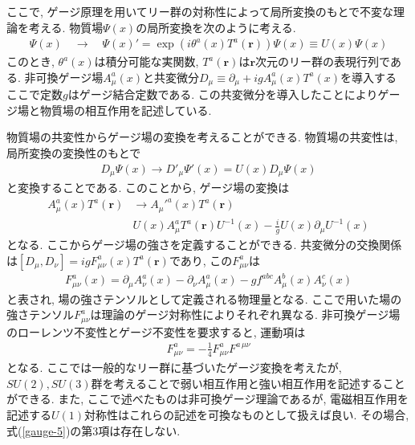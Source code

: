 ここで, ゲージ原理を用いてリー群の対称性によって局所変換のもとで不変な理論を考える.
物質場$\Psi(x)$の局所変換を次のように考える.
\begin{align}
  \Psi(x)\quad\rightarrow\quad\Psi(x)' = \exp\left(i\theta^a(x)T^a(\bm{r})\right)\Psi(x) \equiv U(x)\Psi(x) \label{gauge-2}
\end{align}
このとき, $\theta^a(x)$は積分可能な実関数, $T^a(\bm{r})$は$\bm{r}$次元のリー群の表現行列である.
非可換ゲージ場$A^a_\mu(x)$と共変微分$D_\mu\equiv\partial_\mu+ig A^a_\mu(x)T^a(x)$を導入する
ここで定数$g$はゲージ結合定数である.
この共変微分を導入したことによりゲージ場と物質場の相互作用を記述している.

物質場の共変性からゲージ場の変換を考えることができる.
物質場の共変性は, 局所変換の変換性のもとで
\begin{align}
  D_\mu\Psi(x) \rightarrow D'_\mu \Psi'(x) = U(x) D_\mu \Psi(x)\label{gauge-3}
\end{align}
と変換することである.
このことから, ゲージ場の変換は
\begin{align}
   A_\mu^a(x) T^a(\bm{r}) &\rightarrow A_\mu'^a(x) T^a(\bm{r})\nonumber\\
                          & U(x)A_\mu^a T^a(\bm{r}) U^{-1}(x) -\frac{i}{g}U(x)\partial_\mu U^{-1}(x) \label{gauge-4}
\end{align}
となる.
ここからゲージ場の強さを定義することができる.
共変微分の交換関係は$[D_\mu,D_\nu] = igF_{\mu\nu}^a(x)T^a(\bm{r})$であり, この$F_{\mu\nu}^a$は
\begin{align}
  F_{\mu\nu}^a(x) = \partial_\mu A_\nu^a(x) - \partial_\nu A_\mu^a(x) - gf^{abc}A_\mu^b(x)A_\nu^c(x)\label{gauge-5}
\end{align}
と表され, 場の強さテンソルとして定義される物理量となる.
ここで用いた場の強さテンソル$F_{\mu\nu}^a$は理論のゲージ対称性によりそれぞれ異なる.
非可換ゲージ場のローレンツ不変性とゲージ不変性を要求すると, 運動項は
\begin{align}
  F_{\mu\nu}^a = -\frac{1}{4}F_{\mu\nu}^a F^{a\,\mu\nu}\label{gauge-6}
\end{align}
となる.
ここでは一般的なリー群に基づいたゲージ変換を考えたが, $SU(2), SU(3)$群を考えることで弱い相互作用と強い相互作用を記述することができる.
また, ここで述べたものは非可換ゲージ理論であるが, 電磁相互作用を記述する$U(1)$対称性はこれらの記述を可換なものとして扱えば良い.
その場合, 式(\ref{gauge-5})の第3項は存在しない. 

